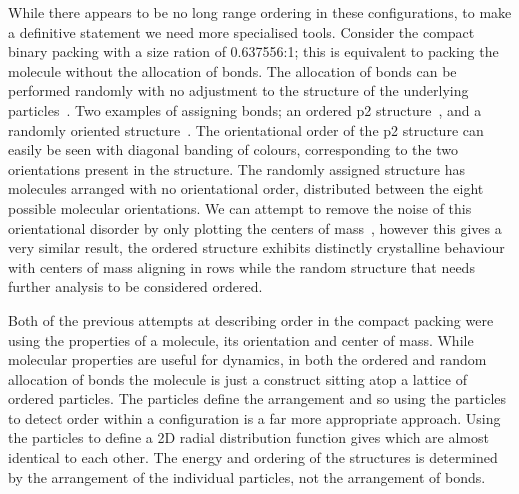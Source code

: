 While there appears to be no long range ordering in these configurations, to make a definitive statement we need more specialised tools. Consider the compact binary packing with a size ration of 0.637556:1; this is equivalent to packing the \scon molecule without the allocation of bonds. The allocation of bonds can be performed randomly with no adjustment to the structure of the underlying particles~. Two examples of assigning bonds; an ordered p2 structure~, and a randomly oriented structure~. The orientational order of the p2 structure can easily be seen with diagonal banding of colours, corresponding to the two orientations present in the structure. The randomly assigned structure has molecules arranged with no orientational order, distributed between the eight possible molecular orientations. We can attempt to remove the noise of this orientational disorder by only plotting the centers of mass~, however this gives a very similar result, the ordered structure exhibits distinctly crystalline behaviour with centers of mass aligning in rows while the random structure that needs further analysis to be considered ordered.

Both of the previous attempts at describing order in the compact packing were using the properties of a molecule, its orientation and center of mass. While molecular properties are useful for dynamics, in both the ordered and random allocation of bonds the molecule is just a construct sitting atop a lattice of ordered particles. The particles define the arrangement and so using the particles to detect order within a configuration is a far more appropriate approach. Using the particles to define a 2D radial distribution function gives  which are almost identical to each other. The energy and ordering of the structures is determined by the arrangement of the individual particles, not the arrangement of bonds.

